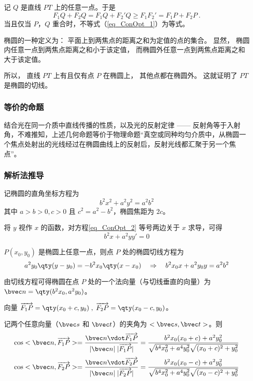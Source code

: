 记 $Q$ 是直线 $PT$ 上的任意一点。于是
\begin{equation}\label{eq_ConOpt_1}
F_1Q + F_2Q = F_1Q + F_2'Q \geqslant F_1F_2' = F_1P + F_2P~.
\end{equation}
当且仅当 $P$，$Q$ 重合时，不等式（\autoref{eq_ConOpt_1}）为等式。

椭圆的一种定义为：
平面上到两焦点的距离之和为定值的点的集合。 显然， 椭圆内任意一点到两焦点距离之和小于该定值， 而椭圆外任意一点到两焦点距离之和大于该定值。 

所以， 直线 $PT$ 上有且仅有点 $P$ 在椭圆上， 其他点都在椭圆外。 这就证明了 $PT$ 是椭圆的切线。

\subsubsection{等价的命题}
结合光在同一介质中直线传播的性质，以及光的反射定律 —— 反射角等于入射角，不难推知，上述几何命题等价于物理命题“真空或同种均匀介质中，从椭圆一个焦点处射出的光线经过在椭圆曲线上的反射后，反射光线都汇聚于另一个焦点”。

\subsubsection{解析法推导}
记椭圆的直角坐标方程为
\begin{equation}\label{eq_ConOpt_2}
b^2 x^2 +a^2 y^2=a^2 b^2
\end{equation}
其中 $a>b>0,c>0$ 且 $c^2=a^2-b^2$，椭圆焦距为 $2c$。

将 $y$ 视作 $x$ 的函数，对方程\autoref{eq_ConOpt_2} 等号两边关于 $x$ 求导，可得
\begin{equation}
b^2 x +a^2 yy'= 0
\end{equation}

$P(x_0,y_0)$ 是椭圆上任意一点，则点 $P$ 处的椭圆切线方程为
\begin{equation}
a^2 y_0 \qty(y - y_0) = - b^2 x_0 \qty(x - x_0) \quad
\Rightarrow \quad
b^2 x_0 x + a^2 y_0 y = a^2 b^2
\end{equation}

由切线方程可得椭圆在点 $P$ 处的一个法向量（与切线垂直的向量）为 $\bvec n = \qty(b^2 x_0,a^2 y_0)$。

向量 $\overrightarrow{F_1P}=\qty(x_0 +c,y_0)\; ,\; \overrightarrow{F_2P}=\qty(x_0 -c,y_0)$。

记两个任意向量（$\bvec s$ 和 $\bvec t$）的夹角为 $<\bvec s,\bvec t>$。则
\begin{equation}\label{eq_ConOpt_5}
\cos<\bvec n,\overrightarrow{F_1P}>=\frac{\bvec n \vdot \overrightarrow{F_1P}}{|\bvec n| \; |\overrightarrow{F_1P}|}= \frac{b^2 x_0 (x_0+c)+a^2 y_0^2}{\sqrt{b^4 x_0^2+a^4 y_0^2}\sqrt{(x_0+c)^2+y_0^2}}
\end{equation}
\begin{equation}\label{eq_ConOpt_6}
\cos<\bvec n,\overrightarrow{F_2P}>=\frac{\bvec n \vdot \overrightarrow{F_2P}}{|\bvec n| \; |\overrightarrow{F_2P}|}= \frac{b^2 x_0 (x_0-c)+a^2 y_0^2}{\sqrt{b^4 x_0^2+a^4 y_0^2}\sqrt{(x_0-c)^2+y_0^2}}
\end{equation}

